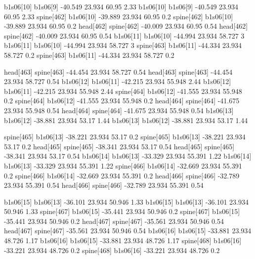 b1s06[10]    b1s06[9]    -40.549    23.934    60.95    2.33
b1s06[10]    b1s06[9]    -40.549    23.934    60.95    2.33
spine[462]    b1s06[10]    -39.889    23.934    60.95    0.2
spine[462]    b1s06[10]    -39.889    23.934    60.95    0.2
head[462]    spine[462]    -40.009    23.934    60.95    0.54
head[462]    spine[462]    -40.009    23.934    60.95    0.54
b1s06[11]    b1s06[10]    -44.994    23.934    58.727    3
b1s06[11]    b1s06[10]    -44.994    23.934    58.727    3
spine[463]    b1s06[11]    -44.334    23.934    58.727    0.2
spine[463]    b1s06[11]    -44.334    23.934    58.727    0.2


head[463]    spine[463]    -44.454    23.934    58.727    0.54
head[463]    spine[463]    -44.454    23.934    58.727    0.54
b1s06[12]    b1s06[11]    -42.215    23.934    55.948    2.44
b1s06[12]    b1s06[11]    -42.215    23.934    55.948    2.44
spine[464]    b1s06[12]    -41.555    23.934    55.948    0.2
spine[464]    b1s06[12]    -41.555    23.934    55.948    0.2
head[464]    spine[464]    -41.675    23.934    55.948    0.54
head[464]    spine[464]    -41.675    23.934    55.948    0.54
b1s06[13]    b1s06[12]    -38.881    23.934    53.17    1.44
b1s06[13]    b1s06[12]    -38.881    23.934    53.17    1.44


spine[465]    b1s06[13]    -38.221    23.934    53.17    0.2
spine[465]    b1s06[13]    -38.221    23.934    53.17    0.2
head[465]    spine[465]    -38.341    23.934    53.17    0.54
head[465]    spine[465]    -38.341    23.934    53.17    0.54
b1s06[14]    b1s06[13]    -33.329    23.934    55.391    1.22
b1s06[14]    b1s06[13]    -33.329    23.934    55.391    1.22
spine[466]    b1s06[14]    -32.669    23.934    55.391    0.2
spine[466]    b1s06[14]    -32.669    23.934    55.391    0.2
head[466]    spine[466]    -32.789    23.934    55.391    0.54
head[466]    spine[466]    -32.789    23.934    55.391    0.54


b1s06[15]    b1s06[13]    -36.101    23.934    50.946    1.33
b1s06[15]    b1s06[13]    -36.101    23.934    50.946    1.33
spine[467]    b1s06[15]    -35.441    23.934    50.946    0.2
spine[467]    b1s06[15]    -35.441    23.934    50.946    0.2
head[467]    spine[467]    -35.561    23.934    50.946    0.54
head[467]    spine[467]    -35.561    23.934    50.946    0.54
b1s06[16]    b1s06[15]    -33.881    23.934    48.726    1.17
b1s06[16]    b1s06[15]    -33.881    23.934    48.726    1.17
spine[468]    b1s06[16]    -33.221    23.934    48.726    0.2
spine[468]    b1s06[16]    -33.221    23.934    48.726    0.2


